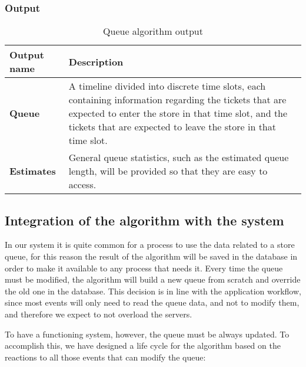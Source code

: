 
\subsubsection{Output}
\label{subsubsect:Output}

\begin{table}[h!]
    \centering
    \begin{tabular}{@{}P{0.13\textwidth}P{0.85\textwidth}@{}}
        \toprule
        \textbf{Output name}& \textbf{Description}\\
        \midrule
        \textbf{Queue}                & A timeline divided into discrete time slots, each containing information regarding the tickets that are expected to enter the store in that time slot, and the tickets that are expected to leave the store in that time slot.\\
        \textbf{Estimates}            & General queue statistics, such as the estimated queue length, will be provided so that they are easy to access.\\
    \end{tabular}
\caption{Queue algorithm output}
\label{table:output}
\end{table}

\subsection{Integration of the algorithm with the system}
\label{subsubsect:integrationofthealgorithmintothesystem}

In our system it is quite common for a process to use the data related to a store queue, for this reason the result of the algorithm will be saved in the database in order to make it available to any process that needs it. Every time the queue must be modified, the algorithm will build a new queue from scratch and override the old one in the database. This decision is in line with the application workflow, since most events will only need to read the queue data, and not to modify them, and therefore we expect to not overload the servers.

To have a functioning system, however, the queue must be always updated. To accomplish this, we have designed a life cycle for the algorithm based on the reactions to all those events that can modify the queue:

